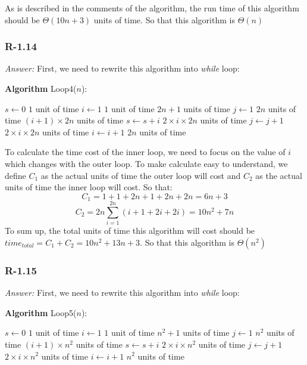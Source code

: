 \documentclass[11pt]{article}
\begin{document}
	As is described in the comments of the algorithm, the run time of this algorithm should be $\Theta(10n+3)$ units of time. So that this algorithm is $\Theta(n)$
\subsubsection{R-1.14}
	\emph{Answer:}
	First, we need to rewrite this algorithm into \emph{while} loop:
	
	\textbf{Algorithm} Loop4($n$):
	
	\begin{algorithmic}
		\State $s \gets 0$ \Comment $1$ unit of time
		\State $i \gets 1$ \Comment $1$ unit of time
		 \Comment $2n+1$ units of time
			\State $j \gets 1$ \Comment $2n$ units of time
				 \Comment $(i+1) \times 2n$ units of time
					\State $s \gets s+i$ \Comment $2\times i \times 2n$ units of time
					\State $j \gets j+1$ \Comment $2\times i \times 2n$ units of time
				\EndWhile
			\State $i \gets i+1$ \Comment $2n$ units of time
		\EndWhile
	\end{algorithmic}
	
	To calculate the time cost of the inner loop, we need to focus on the value of $i$ which changes with the outer loop. To make calculate easy to understand, we define $C_1$ as the actual units of time the outer loop will cost and $C_2$ as the actual units of time the inner loop will cost. So that:
	\begin{equation*}
		C_1=1+1+2n+1+2n+2n = 6n+3 
	\end{equation*}
	\begin{equation*}
		C_2=2n\sum_{i=1}^{2n} (i+1+2i+2i)=10n^2+7n
	\end{equation*}
	To sum up, the total units of time this algorithm will cost should be $time_{total} = C_1 + C_2 = 10n^2+13n+3$. So that this algorithm is $\Theta(n^2)$
\subsubsection{R-1.15}
	\emph{Answer:}
	First, we need to rewrite this algorithm into \emph{while} loop:
	
	\textbf{Algorithm} Loop5($n$):
	
	\begin{algorithmic}
		\State $s\gets0$ \Comment $1$ unit of time
		\State $i\gets1$ \Comment $1$ unit of time
		 \Comment $n^2+1$ units of time
			\State $j \gets 1$ \Comment $n^2$ units of time
			 \Comment $(i+1) \times n^2$ units of time
				\State $s\gets s+i$ \Comment $2\times i \times n^2$ units of time
				\State $j\gets j+1$ \Comment $2\times i \times n^2$ units of time
			\EndWhile
			\State $i\gets i+1$ \Comment $n^2$ units of time
		\EndWhile
	\end{algorithmic}
	
\end{document}

